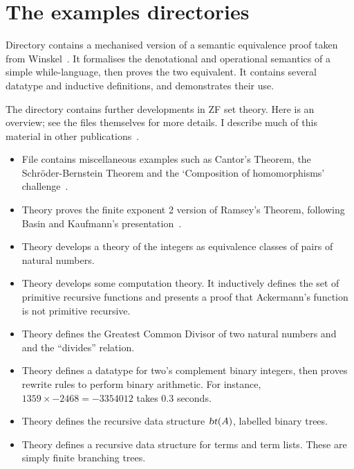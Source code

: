\section{The examples directories}
Directory  contains a mechanised version of a semantic
equivalence proof taken from Winskel~\cite{winskel93}.  It formalises the
denotational and operational semantics of a simple while-language, then
proves the two equivalent.  It contains several datatype and inductive
definitions, and demonstrates their use.

The directory  contains further developments in ZF set theory.
Here is an overview; see the files themselves for more details.  I describe
much of this material in other
publications~\cite{paulson-set-I,paulson-set-II,paulson-fixedpt-milner}.
\begin{itemize}
\item File  contains miscellaneous examples such as
  Cantor's Theorem, the Schr\"oder-Bernstein Theorem and the `Composition
  of homomorphisms' challenge~\cite{boyer86}.

\item Theory  proves the finite exponent 2 version of
  Ramsey's Theorem, following Basin and Kaufmann's
  presentation~\cite{basin91}.

\item Theory  develops a theory of the integers as
  equivalence classes of pairs of natural numbers.

\item Theory  develops some computation theory.  It
  inductively defines the set of primitive recursive functions and presents a
  proof that Ackermann's function is not primitive recursive.

\item Theory  defines the Greatest Common Divisor of two
  natural numbers and and the ``divides'' relation.

\item Theory  defines a datatype for two's complement binary
  integers, then proves rewrite rules to perform binary arithmetic.  For
  instance, $1359\times {-}2468 = {-}3354012$ takes 0.3 seconds.

\item Theory  defines the recursive data structure $\emph{\sl bt}(A)$, labelled binary trees.

\item Theory  defines a recursive data structure for terms
  and term lists.  These are simply finite branching trees.


\end{itemize}
